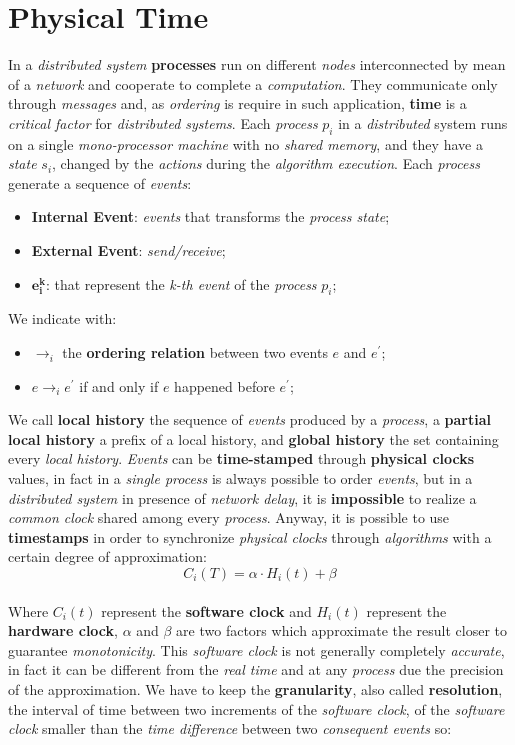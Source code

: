 \documentclass{article}
\begin{document}
\section{Physical Time}
In a \emph{distributed system} \textbf{processes} run on different \emph{nodes} interconnected by mean of a \emph{network} and cooperate to complete a \emph{computation}. They communicate only through \emph{messages} and, as \emph{ordering} is require in such application, \textbf{time} is a \emph{critical factor} for \emph{distributed systems}. Each \emph{process} $p_i$ in a \emph{distributed} system runs on a single \emph{mono-processor machine} with no \emph{shared memory}, and they have a \emph{state} $s_i$, changed by the \emph{actions} during the \emph{algorithm execution}. Each \emph{process} generate a sequence of \emph{events}: 
\begin{itemize}
\item \textbf{Internal Event}: \emph{events} that transforms the \emph{process state};
\item \textbf{External Event}: \emph{send/receive};
\item $\mathbf{e_i^k}$: that represent the\emph{ k-th event} of the \emph{process} $p_i$;
\end{itemize}
We indicate with:
\begin{itemize}
\item $\rightarrow _i$ the \textbf{ordering relation} between two events $e$ and $e^{'}$;
\item $e \rightarrow _i e^{'}$ if and only if $e$ happened before $e^{'}$;
\end{itemize}
We call \textbf{local history} the sequence of \emph{events} produced by a \emph{process}, a \textbf{partial local history} a prefix of a local history, and \textbf{global history} the set containing every \emph{local history}. \emph{Events} can be \textbf{time-stamped} through \textbf{physical clocks} values, in fact in a \emph{single process} is always possible to order \emph{events}, but in a \emph{distributed system} in presence of \emph{network delay}, it is \textbf{impossible} to realize a \emph{common clock} shared among every \emph{process}. Anyway, it is possible to use \textbf{timestamps} in order to synchronize \emph{physical clocks} through \emph{algorithms} with a certain degree of approximation:
\[C_i(T)= \alpha\cdot H_i(t) + \beta \]\\
Where $C_i(t)$ represent the \textbf{software clock} and $H_i(t)$ represent the \textbf{hardware clock}, $\alpha$ and $\beta$ are two factors which approximate the result closer to guarantee \emph{monotonicity}. This \emph{software clock} is not generally completely \emph{accurate}, in fact it can be different from the \emph{real time} and at any \emph{process} due the precision of the approximation. We have to keep the \textbf{granularity}, also called \textbf{resolution}, the interval of time between two increments of the \emph{software clock}, of the \emph{software clock} smaller than the \emph{time difference} between two \emph{consequent events} so:
\end{document}
